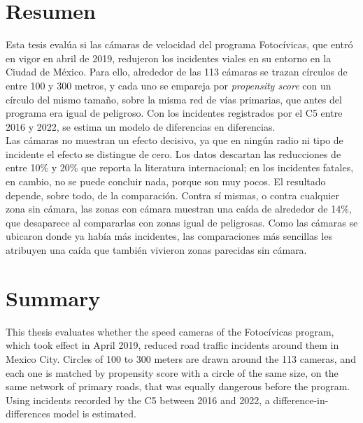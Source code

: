 \documentclass[11pt, oneside]{book}
\begin{document}



\chapter*{Resumen}
\pagestyle{plain}

\noindent Esta tesis evalúa si las cámaras de velocidad del programa Fotocívicas, que entró en vigor en abril de 2019, redujeron los incidentes viales en su entorno en la Ciudad de México. Para ello, alrededor de las 113 cámaras se trazan círculos de entre 100 y 300 metros, y cada uno se empareja por \emph{propensity score} con un círculo del mismo tamaño, sobre la misma red de vías primarias, que antes del programa era igual de peligroso. Con los incidentes registrados por el C5 entre 2016 y 2022, se estima un modelo de diferencias en diferencias.\\

Las cámaras no muestran un efecto decisivo, ya que en ningún radio ni tipo de incidente el efecto se distingue de cero. Los datos descartan las reducciones de entre 10\% y 20\% que reporta la literatura internacional; en los incidentes fatales, en cambio, no se puede concluir nada, porque son muy pocos. El resultado depende, sobre todo, de la comparación. Contra sí mismas, o contra cualquier zona sin cámara, las zonas con cámara muestran una caída de alrededor de 14\%, que desaparece al compararlas con zonas igual de peligrosas. Como las cámaras se ubicaron donde ya había más incidentes, las comparaciones más sencillas les atribuyen una caída que también vivieron zonas parecidas sin cámara.


\chapter*{Summary}
\pagestyle{plain}

\noindent This thesis evaluates whether the speed cameras of the Fotocívicas program, which took effect in April 2019, reduced road traffic incidents around them in Mexico City. Circles of 100 to 300 meters are drawn around the 113 cameras, and each one is matched by propensity score with a circle of the same size, on the same network of primary roads, that was equally dangerous before the program. Using incidents recorded by the C5 between 2016 and 2022, a difference-in-differences model is estimated.\\
\end{document}

